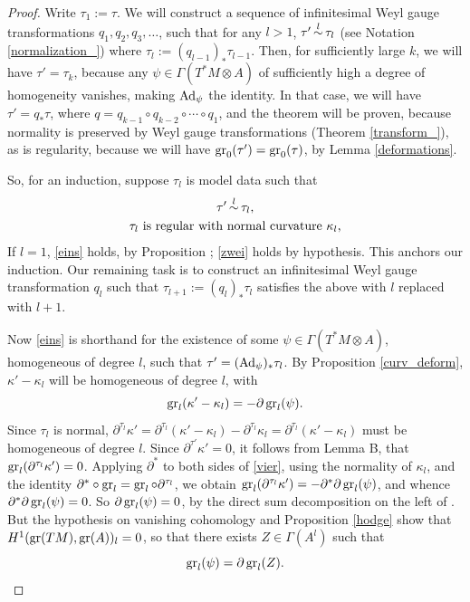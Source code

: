 \documentclass[leqno,12pt]{amsart} %
\begin{document}
\begin{proof}
  Write $\tau_1 := \tau$. We will construct a sequence of infinitesimal Weyl gauge
  transformations $q_1, q_2, q_3, \ldots$, such that for any $l > 1$,
  $\tau' {\overset{l}{\,\sim\,}} \tau_l$ (see Notation \ref{normalization_}) where
  $\tau_l := (q_{l-1})_*\tau_{l-1}$. Then, for sufficiently large $k$, we will have
  $\tau' = \tau_k$, because any $\psi \in \Gamma(T^*\!M \otimes A)$ of sufficiently high a
  degree of homogeneity vanishes, making $\operatorname{Ad}_\psi $ the identity. In that case, we
  will have $\tau' = q_* \tau$, where $q = q_{k-1} \circ q_{k-2} \circ \cdots \circ q_1$,
  and the theorem will be proven, because normality is preserved by Weyl gauge
  transformations (Theorem \ref{transform_}), as is regularity, because we will have
  $\operatorname{\operatorname{gr}}_0(\tau')=\operatorname{\operatorname{gr}}_0(\tau)$, by Lemma \ref{deformations}.

  So, for an induction, suppose $\tau_l$ is model data such that
  \begin{gather}
    \tau' {\overset{l}{\,\sim\,}} \tau_l,\label{eins}\\
    \text{$\tau_l$ is regular with normal curvature $\kappa_l$,}\label{zwei}
  \end{gather}
  If $l=1$, \eqref{eins} holds, by Proposition ;
  \eqref{zwei} holds by hypothesis. This anchors our induction. Our remaining task is to
  construct an infinitesimal Weyl gauge transformation $q_l$ such that
  $\tau_{l+1} := (q_l)_*\tau_l$ satisfies the above with $l$ replaced with $l + 1$.

  Now \eqref{eins} is shorthand for the existence of some
  $\psi \in \Gamma(T^*\!M \otimes A)$, homogeneous of degree $l$, such that
  $\tau'=(\operatorname{Ad}_\psi)_*\tau_l$. By Proposition \ref{curv_deform}, $\kappa' - \kappa_l$
  will be homogeneous of degree $l$, with
  \begin{equation}
    \label{vier}
    \operatorname{\operatorname{gr}}_l(\kappa' - \kappa_l) = -\partial\operatorname{\operatorname{gr}}_l(\psi).
  \end{equation}
  Since $\tau_l $ is normal,
  $\partial^{\tau_l} \kappa' = \partial^{\tau_l}(\kappa' - \kappa_l) -
  \partial^{\tau_l}\kappa_l= \partial^{\tau_l}(\kappa' - \kappa_l)$ must be homogeneous of
  degree $l$. Since $\partial^{\tau'}\kappa' = 0$, it follows from Lemma B, that
  $\operatorname{\operatorname{gr}}_l(\partial^{\tau_l}\kappa')=0$. Applying $\partial^*$ to both sides of
  \eqref{vier}, using the normality of $\kappa_l$, and the identity
  $\partial^*\circ \operatorname{\operatorname{gr}}_l=\operatorname{\operatorname{gr}}_l \circ \partial^{\tau_l}$, we obtain
  $\operatorname{\operatorname{gr}}_l(\partial^{\tau_l}\kappa') = -\partial^*\partial \operatorname{\operatorname{gr}}_l(\psi)$, and whence
  $\partial^*\partial \operatorname{\operatorname{gr}}_l(\psi) = 0$. So $\partial \operatorname{\operatorname{gr}}_l(\psi) = 0$, by the
  direct sum decomposition on the left of . But the hypothesis
  on vanishing cohomology and Proposition \ref{hodge} show that
  $H^1(\operatorname{\operatorname{gr}}(TM), \operatorname{\operatorname{gr}}(A))_l=0$, so that there exists $Z \in \Gamma(A^l)$ such that
  \begin{equation}
    \label{funf}
    \operatorname{\operatorname{gr}}_l(\psi) = \partial \operatorname{\operatorname{gr}}_l(Z).
  \end{equation}


\end{proof}
\end{document}
